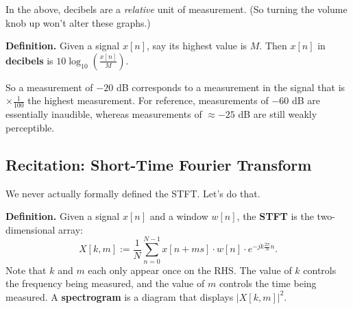 In the above, decibels are a \emph{relative} unit of measurement.
(So turning the volume knob up won't alter these graphs.)

\textbf{Definition.}
Given a signal $x[n]$, say its highest value is $M$.
Then $x[n]$ in \textbf{decibels} is $10 \log_{10}\left(\frac{x[n]}{M}\right)$.

So a measurement of $-20$ dB corresponds to
a measurement in the signal that is $\times \frac{1}{100}$ the highest measurement.
For reference, measurements of $-60$ dB are essentially inaudible,
whereas measurements of $\approx -25$ dB are still weakly perceptible.

\subsection{Recitation: Short-Time Fourier Transform}

We never actually formally defined the STFT.  Let's do that.

\textbf{Definition.} Given a signal $x[n]$ and a window $w[n]$,
the \textbf{STFT} is the two-dimensional array:
\[ X[k, m] := \frac{1}{N} \sum_{n = 0}^{N - 1}
x[n + ms] \cdot w[n] \cdot e^{-jk \frac{2\pi}{N} n}. \]
Note that $k$ and $m$ each only appear once on the RHS.
The value of $k$ controls the frequency being measured,
and the value of $m$ controls the time being measured.
A \textbf{spectrogram} is a diagram that displays $|X[k, m]|^2$.

